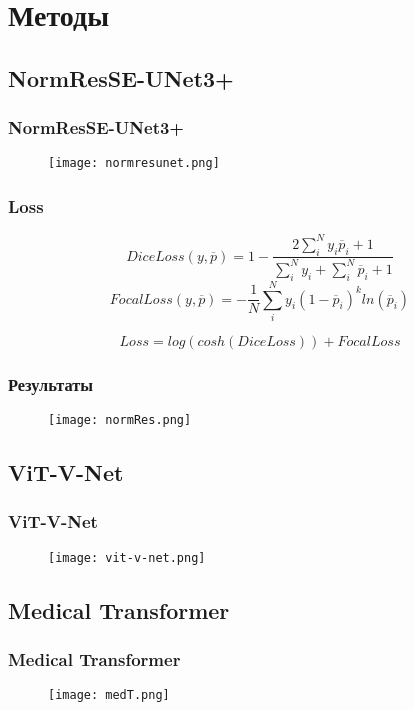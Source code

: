 
\section{Методы}

\subsection{NormResSE-UNet3+}
\begin{frame}
    \frametitle{NormResSE-UNet3+}
    \begin{figure}
        \texttt{[image: normresunet.png]}
    \end{figure}


\end{frame}

\begin{frame}
    \frametitle{Loss}

    \[DiceLoss(y, \overline{p})=1 - \frac{2\sum_{i}^{N}y_{i}\overline{p}_i+1}{\sum_{i}^{N}y_i+\sum_{i}^{N}\overline{p}_i+1}\]
    \[FocalLoss(y, \overline{p}) = -\frac{1}{N}\sum_{i}^{N}y_{i}(1-\overline{p}_i)^{k}ln(\overline{p}_i)\]

    \[Loss = log(cosh(DiceLoss))+FocalLoss\]


\end{frame}

\begin{frame}
    \frametitle{Результаты}
    \begin{figure}
        \texttt{[image: normRes.png]}
    \end{figure}
\end{frame}

\subsection{ViT-V-Net}

\begin{frame}
    \frametitle{ViT-V-Net}
    \begin{figure}
        \texttt{[image: vit-v-net.png]}
    \end{figure}
\end{frame}


\subsection{Medical Transformer}

\begin{frame}
    \frametitle{Medical Transformer}
    \begin{figure}
        \texttt{[image: medT.png]}
    \end{figure}
\end{frame}